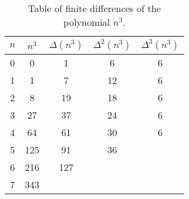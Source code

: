 \begin{table}[H]
    \begin{center}
        \setlength\extrarowheight{-6pt}
        \begin{tabular}{c|cccc}
            $n$ & $n^3$ & $\Delta(n^3)$ & $\Delta^2(n^3)$ & $\Delta^3(n^3)$ \\
            \hline
            0   & 0     & 1             & 6               & 6               \\
            1   & 1     & 7             & 12              & 6               \\
            2   & 8     & 19            & 18              & 6               \\
            3   & 27    & 37            & 24              & 6               \\
            4   & 64    & 61            & 30              & 6               \\
            5   & 125   & 91            & 36              &                 \\
            6   & 216   & 127           &                 &                 \\
            7   & 343   &               &                 &
        \end{tabular}
    \end{center}
    \caption{Table of finite differences of the polynomial $n^3$.} \label{tab:differneces-of-cubes}
\end{table}
